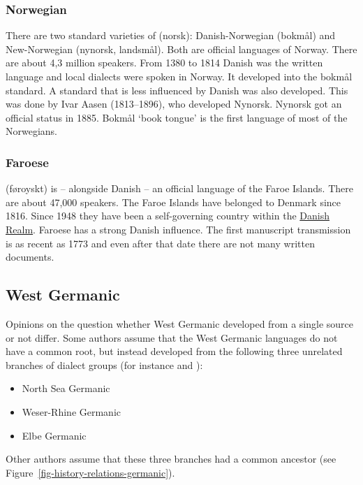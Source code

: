 \subsubsection{Norwegian}

There are two standard varieties of  (norsk): Danish-Norwegian (bokmål) and New-Norwegian (nynorsk, landsmål). 
Both are official languages of Norway.
There are about 4,3 million speakers.
From 1380 to 1814 Danish was the written language and local dialects were spoken in Norway. It developed into the bokmål standard.
A standard that is less influenced by Danish was also developed. This was done by Ivar Aasen (1813--1896), 
who developed Nynorsk. Nynorsk got an official status in 1885. Bokmål `book tongue' is the first language of most
of the Norwegians.

\subsubsection{Faroese}

 (føroyskt) is -- alongside Danish -- an official language of the Faroe Islands. There
are about 47,000 speakers. The Faroe Islands have belonged to Denmark since 1816. Since 1948 they
have been a self-governing country within the \href{https://en.wikipedia.org/wiki/Danish_Realm}{Danish Realm}.
Faroese has a strong Danish influence. The first manuscript transmission is as recent as 1773 and
even after that date there are not many written documents. 


\subsection{West Germanic}


Opinions on the question whether West Germanic developed from a single source or not differ. Some authors
assume that the West Germanic languages do not have a common root, but instead developed from the
following three unrelated branches of dialect groups (for instance \citealp[--18]{Robinson1992a-u} and
\citealp[]{HvDA94a}):
\begin{itemize}
\item North Sea Germanic %
\item Weser-Rhine Germanic %
\item Elbe Germanic %
\end{itemize}
Other authors assume that these three branches had a common ancestor (see Figure~\ref{fig-history-relations-germanic}).

